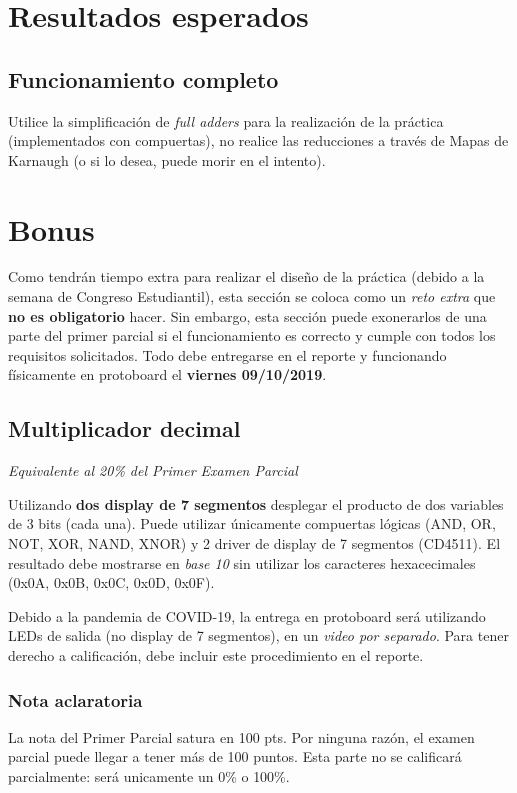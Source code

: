 \section{Resultados esperados}
\subsection{Funcionamiento completo}
Utilice la simplificación de \emph{full adders} para la realización de la práctica (implementados con compuertas), no realice las reducciones a través de Mapas de Karnaugh (o si lo desea, puede
morir en el intento).

\pagebreak

\section{Bonus}
Como tendrán tiempo extra para realizar el diseño de la práctica (debido a la semana de Congreso Estudiantil), esta sección se coloca como un \emph{reto extra} 
que \textbf{no es obligatorio} hacer. Sin embargo, esta sección puede exonerarlos de una parte del primer parcial si el funcionamiento es correcto
y cumple con todos los requisitos solicitados. Todo debe entregarse en el reporte y funcionando físicamente en protoboard el \textbf{viernes 09/10/2019}.

\subsection{Multiplicador decimal} \label{sec:Multiplicador}
\emph{Equivalente al 20\% del Primer Examen Parcial}
\vspace{14pt}

Utilizando \textbf{dos display de 7 segmentos} desplegar el producto de dos variables de 3 bits (cada una). Puede utilizar
únicamente compuertas lógicas (AND, OR, NOT, XOR, NAND, XNOR) y 2 driver de display de 7 segmentos (CD4511). El resultado debe mostrarse en \emph{base 10}
sin utilizar los caracteres hexacecimales (0x0A, 0x0B, 0x0C, 0x0D, 0x0F).

Debido a la pandemia de COVID-19, la entrega en protoboard será utilizando LEDs de salida (no display de 7 segmentos), en un \emph{video por separado}.
Para tener derecho a calificación, debe incluir este procedimiento en el reporte.

\subsubsection{Nota aclaratoria}
La nota del Primer Parcial satura en 100 pts. Por ninguna razón, el examen parcial puede llegar a tener más de 100 puntos.
Esta parte no se calificará parcialmente: será unicamente un 0\% o 100\%.